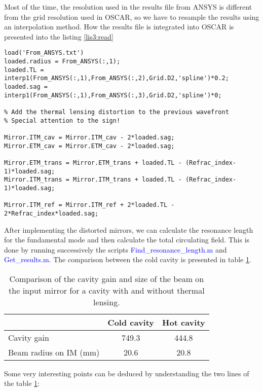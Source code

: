 Most of the time, the resolution used in the results file from ANSYS is different from the grid resolution used in OSCAR, so we have to resample the results using an interpolation method. How the results file is integrated into OSCAR is presented into the listing \ref{lis3:read}

\begin{lstlisting}[float=tp,caption=Commands used to read thermal lensing results from ANSYS. \label{lis3:read},frame=lines]
% Load the results file
load('From_ANSYS.txt')
loaded.radius = From_ANSYS(:,1);
loaded.TL = interp1(From_ANSYS(:,1),From_ANSYS(:,2),Grid.D2,'spline')*0.2;
loaded.sag = interp1(From_ANSYS(:,1),From_ANSYS(:,3),Grid.D2,'spline')*0;

% Add the thermal lensing distortion to the previous wavefront
% Special attention to the sign!

Mirror.ITM_cav = Mirror.ITM_cav - 2*loaded.sag;
Mirror.ETM_cav = Mirror.ETM_cav - 2*loaded.sag;

Mirror.ETM_trans = Mirror.ETM_trans + loaded.TL - (Refrac_index-1)*loaded.sag;
Mirror.ITM_trans = Mirror.ITM_trans + loaded.TL - (Refrac_index-1)*loaded.sag;

Mirror.ITM_ref = Mirror.ITM_ref + 2*loaded.TL - 2*Refrac_index*loaded.sag;
\end{lstlisting}

After implementing the distorted mirrors, we can calculate the resonance length for the fundamental mode and then calculate the total circulating field. This is done by running successively the scripts \textcolor{blue}{Find\_resonance\_length.m} and \textcolor{blue}{Get\_results.m}. The comparison between the cold cavity is presented in table \ref{tab3:res}.

\begin{table}[tbp]
  \centering
  \caption{\label{tab3:res} Comparison of the cavity gain and size of the beam on the input mirror for a cavity with and without thermal lensing.}
\begin{tabular}{|l |c|c|}
\hline
{\large\strut} & Cold cavity & Hot cavity \\
\hline
{\large\strut} Cavity gain & 749.3 & 444.8 \\
{\large\strut} Beam radius on IM (mm)& 20.6 & 20.8 \\
\hline
\end{tabular}
\end{table}

Some very interesting points can be deduced by understanding the two lines of the table \ref{tab3:res}:

